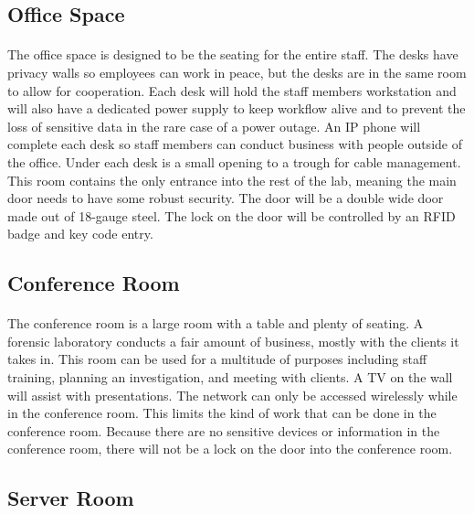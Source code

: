 \documentclass[12pt]{article}
\begin{document}
\subsection{Office Space}
\paragraph{} The office space is designed to be the seating for the entire staff.  
The desks have privacy walls so employees can work in peace, but the desks are in the same room to allow for cooperation.  
Each desk will hold the staff members workstation and will also have a dedicated power supply to keep workflow alive and to prevent the loss of sensitive data in the rare case of a power outage. 
An IP phone will complete each desk so staff members can conduct business with people outside of the office.
Under each desk is a small opening to a trough for cable management.
This room contains the only entrance into the rest of the lab, meaning the main door needs to have some robust security.
The door will be a double wide door made out of 18-gauge steel.
The lock on the door will be controlled by an RFID badge and key code entry.
\subsection{Conference Room}
\paragraph{}
The conference room is a large room with a table and plenty of seating.  
A forensic laboratory conducts a fair amount of business, mostly with the clients it takes in.
This room can be used for a multitude of purposes including staff training, planning an investigation, and meeting with clients.
A TV on the wall will assist with presentations.
The network can only be accessed wirelessly while in the conference room.
This limits the kind of work that can be done in the conference room.
Because there are no sensitive devices or information in the conference room, there will not be a lock on the door into the conference room.

\subsection{Server Room}
\end{document}
